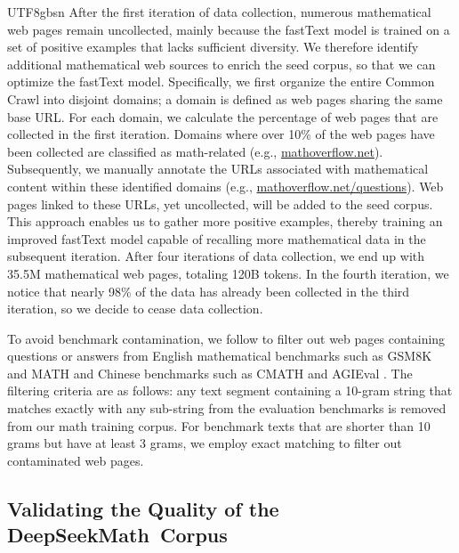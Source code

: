 \documentclass[11pt, a4paper, logo, copyright, nonumbering]{deepseek}
\newcommand{\spmath}{DeepSeekMath}
\begin{document}
\begin{CJK*}{UTF8}{gbsn}
After the first iteration of data collection, numerous mathematical web pages remain uncollected, mainly because the fastText model is trained on a set of positive examples that lacks sufficient diversity.
We therefore identify additional mathematical web sources to enrich the seed corpus, so that we can optimize the fastText model.
Specifically, we first organize the entire Common Crawl into disjoint domains;
a domain is defined as web pages sharing the same base URL.
For each domain, we calculate the percentage of web pages that are collected in the first iteration.
Domains where over 10\% of the web pages have been collected are classified as math-related (e.g., \url{mathoverflow.net}).
Subsequently, we manually annotate the URLs associated with mathematical content within these identified domains (e.g., \url{mathoverflow.net/questions}).
Web pages linked to these URLs, yet uncollected, will be added to the seed corpus.
This approach enables us to gather more positive examples, thereby training an improved fastText model capable of recalling more mathematical data in the subsequent iteration.
After four iterations of data collection, we end up with 35.5M mathematical web pages, totaling 120B tokens.
In the fourth iteration, we notice that nearly 98\% of the data has already been collected in the third iteration, so we decide to cease data collection.

To avoid benchmark contamination, we follow \cite{deepseek-coder} to filter out web pages containing questions or answers from English mathematical benchmarks such as GSM8K \citep{gsm8k} and MATH \citep{MATH} and Chinese benchmarks such as CMATH \citep{wei2023cmath} and AGIEval \citep{agieval}.
The filtering criteria are as follows: any text segment containing a 10-gram string that matches exactly with any sub-string from the evaluation benchmarks is removed from our math training corpus.
For benchmark texts that are shorter than 10 grams but have at least 3 grams, we employ exact matching to filter out contaminated web pages.

\subsection{Validating the Quality of the \spmath~Corpus}


\end{CJK*}
\end{document}
